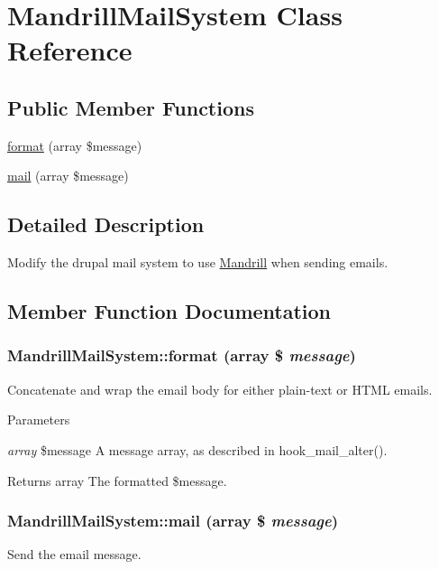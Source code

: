 \hypertarget{classMandrillMailSystem}{
\section{MandrillMailSystem Class Reference}
\label{classMandrillMailSystem}
}
\subsection*{Public Member Functions}
\begin{DoxyCompactItemize}
\item 
\hyperlink{classMandrillMailSystem_a4e7e619d5560224017ccc438c31e40d6}{format} (array \$message)
\item 
\hyperlink{classMandrillMailSystem_a2d56986dfa5ce08e134344078710cf23}{mail} (array \$message)
\end{DoxyCompactItemize}


\subsection{Detailed Description}
Modify the drupal mail system to use \hyperlink{classMandrill}{Mandrill} when sending emails. 

\subsection{Member Function Documentation}
\hypertarget{classMandrillMailSystem_a4e7e619d5560224017ccc438c31e40d6}{
\subsubsection[{format}]{\setlength{\rightskip}{0pt plus 5cm}MandrillMailSystem::format (array \$ {\em message})}}
\label{classMandrillMailSystem_a4e7e619d5560224017ccc438c31e40d6}
Concatenate and wrap the email body for either plain-\/text or HTML emails.


\begin{DoxyParams}{Parameters}
\item[{\em array}]\$message A message array, as described in hook\_\-mail\_\-alter().\end{DoxyParams}
\begin{DoxyReturn}{Returns}
array The formatted \$message. 
\end{DoxyReturn}
\hypertarget{classMandrillMailSystem_a2d56986dfa5ce08e134344078710cf23}{
\subsubsection[{mail}]{\setlength{\rightskip}{0pt plus 5cm}MandrillMailSystem::mail (array \$ {\em message})}}
\label{classMandrillMailSystem_a2d56986dfa5ce08e134344078710cf23}
Send the email message.

